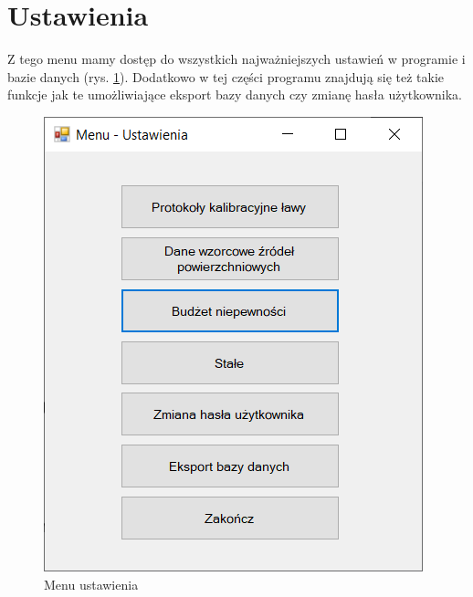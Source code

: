 
\rozdzial

\section{Ustawienia}
\label{ustawienia}

Z tego menu mamy dostęp do wszystkich najważniejszych ustawień w programie i bazie danych (rys. \ref{menuUstawienia}). Dodatkowo w tej części programu znajdują się też takie funkcje jak te umożliwiające eksport bazy danych czy zmianę hasła użytkownika.

\begin{figure}[htb]
	\centering
	\includegraphics{obrazki/Ustawienia/menu_ustawienia.png}
	\caption{Menu ustawienia}
	\label{menuUstawienia}
\end{figure}

